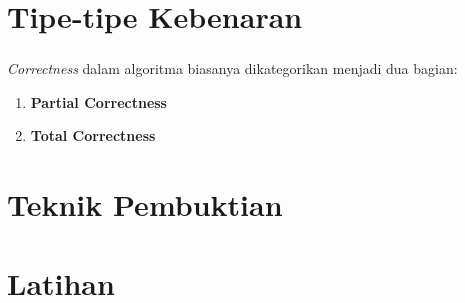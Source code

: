 \documentclass{../praktikum-ppt}
\begin{document}
    \section{Tipe-tipe Kebenaran}

    \begin{frame}
      \frametitle{\insertsection}
      \textit{Correctness} dalam algoritma biasanya dikategorikan menjadi dua bagian:
      \begin{enumerate}
        \item \textbf{Partial Correctness}
        \item \textbf{Total Correctness}
      \end{enumerate}
    \end{frame}

    \section{Teknik Pembuktian}
    \begin{frame}
      \frametitle{\insertsection}
    \end{frame}

    \section{Latihan}
\end{document}

